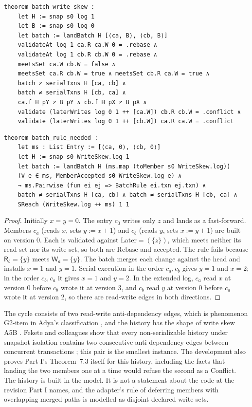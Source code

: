 \documentclass[11pt,letterpaper]{article}
\theoremstyle{definition}
\theoremstyle{remark}
\newcommand{\R}{\mathsf{R}}
\newcommand{\W}{\mathsf{W}}
\newcommand{\Later}{\mathrm{Later}}
\newcommand{\Rb}{\mathrm{Rebase}}
\begin{document}
\begin{lstlisting}[language=Lean,caption={Part I, Theorem 7.3, in the model (\texttt{YonedaTx/Batch.lean})},label={lst:mcbl:writeskew}]
theorem batch_write_skew :
    let H := snap s0 log 1
    let B := snap s0 log 0
    let batch := landBatch H [⟨ca, B⟩, ⟨cb, B⟩]
    validateAt log 1 ca.R ca.W 0 = .rebase ∧
    validateAt log 1 cb.R cb.W 0 = .rebase ∧
    meetsSet ca.W cb.W = false ∧
    meetsSet ca.R cb.W = true ∧ meetsSet cb.R ca.W = true ∧
    batch ≠ serialTxns H [ca, cb] ∧
    batch ≠ serialTxns H [cb, ca] ∧
    ca.f H pY ≠ B pY ∧ cb.f H pX ≠ B pX ∧
    validate (laterWrites log 0 1 ++ [ca.W]) cb.R cb.W = .conflict ∧
    validate (laterWrites log 0 1 ++ [cb.W]) ca.R ca.W = .conflict
\end{lstlisting}

\begin{lstlisting}[language=Lean,caption={The pairwise rule cannot be dropped (\texttt{YonedaTx/Soundness.lean})},label={lst:mcbl:ruleneeded}]
theorem batch_rule_needed :
    let ms : List Entry := [⟨ca, 0⟩, ⟨cb, 0⟩]
    let H := snap s0 WriteSkew.log 1
    let batch := landBatch H (ms.map (toMember s0 WriteSkew.log))
    (∀ e ∈ ms, MemberAccepted s0 WriteSkew.log e) ∧
    ¬ ms.Pairwise (fun ei ej => BatchRule ei.txn ej.txn) ∧
    batch ≠ serialTxns H [ca, cb] ∧ batch ≠ serialTxns H [cb, ca] ∧
    SReach (WriteSkew.log ++ ms) 1 1
\end{lstlisting}

\begin{proof}
Initially $x=y=0$. The entry $c_0$ writes only $z$ and lands as a fast-forward. Members $c_a$ (reads $x$, sets $y:=x+1$) and $c_b$ (reads $y$, sets $x:=y+1$) are built on version 0. Each is validated against $\Later=(\{z\})$, which meets neither its read set nor its write set, so both are $\Rb$ and accepted. The rule fails because $\R_b=\{y\}$ meets $\W_a=\{y\}$. The batch merges each change against the head and installs $x=1$ and $y=1$. Serial execution in the order $c_a,c_b$ gives $y=1$ and $x=2$; in the order $c_b,c_a$ it gives $x=1$ and $y=2$. In the extended log, $c_a$ read $x$ at version 0 before $c_b$ wrote it at version 3, and $c_b$ read $y$ at version 0 before $c_a$ wrote it at version 2, so there are read-write edges in both directions.
\end{proof}

The cycle consists of two read-write anti-dependency edges, which is phenomenon G2-item in Adya's classification \cite[Section 3.2.4]{adya1999thesis}, and the history has the shape of write skew A5B \cite{berenson1995critique}. Fekete and colleagues show that every non-serializable history under snapshot isolation contains two consecutive anti-dependency edges between concurrent transactions \cite[Theorem 2.1]{fekete2005serializable}; this pair is the smallest instance. The development also proves Part I's Theorem~7.3 itself for this history, including the facts that landing the two members one at a time would refuse the second as a Conflict. The history is built in the model. It is not a statement about the code at the revision Part I names, and the adapter's rule of deferring members with overlapping merged paths is modelled as disjoint declared write sets.
\end{document}
